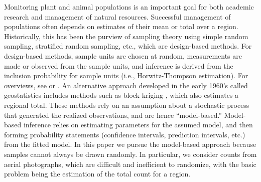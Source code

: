 \documentclass[12pt, titlepage]{article}\usepackage[]{graphicx}\usepackage[]{color}
\begin{document}
Monitoring plant and animal populations is an important goal for both academic research and management of natural resources. Successful management of populations often depends on estimates of their mean or total over a region. Historically, this has been the purview of sampling theory using simple random sampling, stratified random sampling, etc., which are design-based methods.  For design-based methods, sample units are chosen at random, measurements are made or observed from the sample units, and inference is derived from the inclusion probability for sample units (i.e., Horwitz-Thompson estimation).  For overviews, see \citet{Coch:samp:1977} or \citet{Thom:samp:1992}. An alternative approach developed in the early 1960's called geostatistics includes methods such as block kriging \citep{Gand:prob:1959, Gand:opti:1960, Math:Prin:1963}, which also estimates a regional total.  These methods rely on an assumption about a stochastic process that generated the realized observations, and are hence ``model-based.''  Model-based inference relies on estimating parameters for the assumed model, and then forming probability statements (confidence intervals, prediction intervals, etc.) from the fitted model.  In this paper we pursue the model-based approach because samples cannot always be drawn randomly. In particular, we consider counts from aerial photographs, which are difficult and inefficient to randomize, with the basic problem being the estimation of the total count for a region.  
\end{document}
